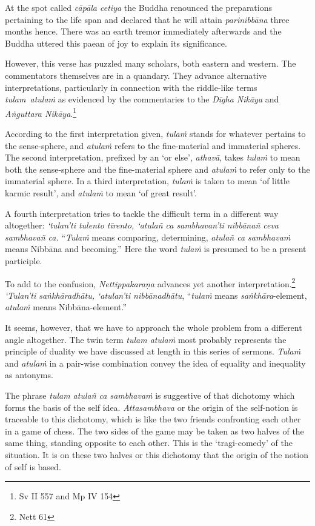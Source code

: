 At the spot called \emph{cāpāla cetiya} the Buddha renounced the preparations pertaining to the life span and declared that he will attain \emph{parinibbāna} three months hence. There was an earth tremor immediately afterwards and the Buddha uttered this paean of joy to explain its significance.

However, this verse has puzzled many scholars, both eastern and western. The commentators themselves are in a quandary. They advance alternative interpretations, particularly in connection with the riddle-like terms \emph{tulam~atulaṁ} as evidenced by the commentaries to the \emph{Dīgha Nikāya} and \emph{Aṅguttara Nikāya}.\footnote{Sv II 557 and Mp IV 154}

According to the first interpretation given, \emph{tulaṁ} stands for whatever pertains to the sense-sphere, and \emph{atulaṁ} refers to the fine-material and immaterial spheres. The second interpretation, prefixed by an `or else', \emph{athavā}, takes \emph{tulaṁ} to mean both the sense-sphere and the fine-material sphere and \emph{atulaṁ} to refer only to the immaterial sphere. In a third interpretation, \emph{tulaṁ} is taken to mean `of little karmic result', and \emph{atulaṁ} to mean `of great result'.

A fourth interpretation tries to tackle the difficult term in a different way altogether: \emph{`tulan'ti tulento tīrento, `atulañ ca sambhavan'ti nibbānañ ceva sambhavañ ca.} ``\emph{Tulaṁ} means comparing, determining, \emph{atulañ ca sambhavaṁ} means Nibbāna and becoming.'' Here the word \emph{tulaṁ} is presumed to be a present participle.

To add to the confusion, \emph{Nettippakaraṇa} advances yet another interpretation.\footnote{Nett 61} \emph{`Tulan'ti saṅkhāradhātu, `atulan'ti nibbānadhātu}, ``\emph{tulaṁ} means \emph{saṅkhāra}-element, \emph{atulaṁ} means Nibbāna-element.''

It seems, however, that we have to approach the whole problem from a different angle altogether. The twin term \emph{tulam atulaṁ} most probably represents the principle of duality we have discussed at length in this series of sermons. \emph{Tulaṁ} and \emph{atulaṁ} in a pair-wise combination convey the idea of equality and inequality as antonyms.

The phrase \emph{tulam atulañ ca sambhavaṁ} is suggestive of that dichotomy which forms the basis of the self idea. \emph{Attasambhava} or the origin of the self-notion is traceable to this dichotomy, which is like the two friends confronting each other in a game of chess. The two sides of the game may be taken as two halves of the same thing, standing opposite to each other. This is the `tragi-comedy' of the situation. It is on these two halves or this dichotomy that the origin of the notion of self is based.

